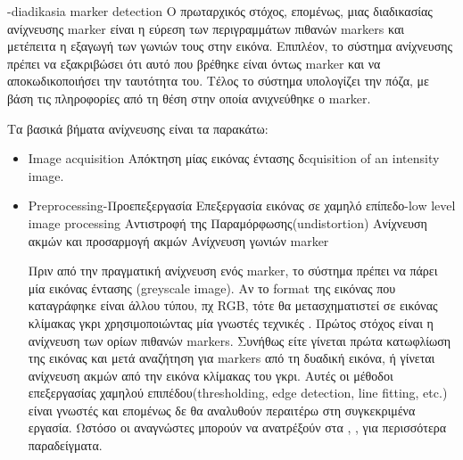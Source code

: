 

-diadikasia marker detection
Ο πρωταρχικός στόχος, επομένως, μιας διαδικασίας ανίχνευσης marker είναι η εύρεση των περιγραμμάτων πιθανών markers και μετέπειτα η εξαγωγή των γωνιών τους στην εικόνα. Επιπλέον, το σύστημα ανίχνευσης πρέπει να εξακριβώσει ότι αυτό που βρέθηκε είναι όντως marker και να αποκωδικοποιήσει την ταυτότητα του. Τέλος το σύστημα υπολογίζει την πόζα, με βάση τις πληροφορίες από τη θέση στην οποία ανιχνεύθηκε ο marker.

Τα βασικά βήματα ανίχνευσης είναι τα παρακάτω:
\begin{itemize}


\item Image acquisition
Απόκτηση μίας εικόνας έντασης
δcquisition of an intensity image.
\item Preprocessing-Προεπεξεργασία
Επεξεργασία εικόνας σε χαμηλό επίπεδο-low level image processing
Αντιστροφή της Παραμόρφωσης(undistortion)
Ανίχνευση ακμών και προσαρμογή ακμών
Ανίχνευση γωνιών marker

Πριν από την πραγματική ανίχνευση ενός marker, το σύστημα πρέπει να πάρει μία εικόνας έντασης (greyscale image). Aν το format της εικόνας που καταγράφηκε είναι άλλου τύπου, πχ RGB, τότε θα μετασχηματιστεί σε εικόνας κλίμακας γκρι χρησιμοποιώντας μία γνωστές τεχνικές \cite{Gonzalez}. 
Πρώτος στόχος είναι η ανίχνευση των ορίων πιθανών markers. Συνήθως είτε γίνεται πρώτα κατωφλίωση της εικόνας και μετά αναζήτηση για markers από τη δυαδική εικόνα, ή γίνεται ανίχνευση ακμών από την εικόνα κλίμακας του γκρι. Αυτές οι μέθοδοι επεξεργασίας χαμηλού επιπέδου(thresholding,
edge detection, line fitting, etc.) είναι γνωστές και επομένως δε θα αναλυθούν περαιτέρω στη συγκεκριμένα εργασία. Ωστόσο οι αναγνώστες μπορούν να ανατρέξούν στα \cite{Gonzalez}, \cite{szeliski2010computer}, για περισσότερα παραδείγματα.


\end{itemize}
